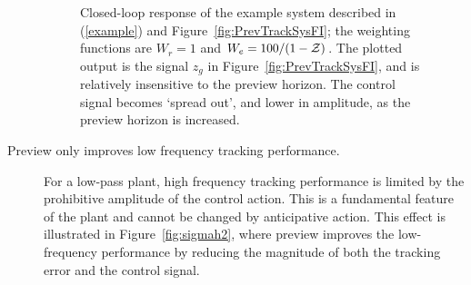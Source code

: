 \begin{description}
\begin{figure}
\caption{Closed-loop response of the example system described in (\ref{example}) and Figure~\ref{fig:PrevTrackSysFI}; the weighting functions are $W_r=1$ and $W_e=100/(1-\mathcal{Z})$. The plotted output is the signal $z_g$ in Figure~\ref{fig:PrevTrackSysFI}, and is relatively insensitive to the preview horizon. The control signal becomes `spread out', and lower in amplitude, as the preview horizon is increased. \label{fig:ReducingControlWithIncreasingN}}
\end{figure}
\item[Preview only improves low frequency tracking performance.] For a low-pass plant, high frequency tracking performance is limited by the prohibitive amplitude of the control action. This is a fundamental feature of the plant and cannot be changed by anticipative action. This effect is illustrated in Figure~\ref{fig:sigmah2}, where preview improves the low-frequency performance by reducing the magnitude of both the tracking error and the control signal. %
\begin{figure}


\end{figure}
\end{description}
